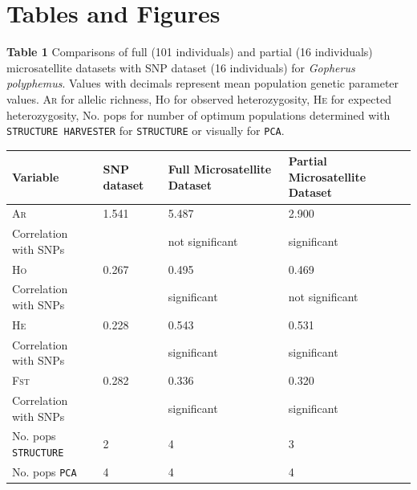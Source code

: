 \documentclass[english]{article}\usepackage[]{graphicx}\usepackage[]{color}
\begin{document}
\section*{Tables and Figures}
\noindent
\textbf{Table 1} Comparisons of full (101 individuals) and partial (16 individuals) microsatellite datasets with SNP dataset (16 individuals) for \textit{Gopherus polyphemus}. Values with decimals represent mean population genetic parameter values. \textsc{Ar} for allelic richness, \textsc{Ho} for observed heterozygosity, \textsc{He} for expected heterozygosity, No. pops for number of optimum populations determined with \texttt{STRUCTURE HARVESTER} for \texttt{STRUCTURE} or visually for \texttt{PCA}. \\
\begin{table}[ht]
\centering
\begin{tabular}{llll}
\hline
Variable & SNP dataset & Full Microsatellite Dataset & Partial Microsatellite Dataset \\ 
\hline
\textsc{Ar}           & 1.541  & 5.487           & 2.900           \\
Correlation with SNPs &        & not significant & significant     \\
\hline
\textsc{Ho}           & 0.267  & 0.495           & 0.469           \\
Correlation with SNPs &        & significant     & not significant \\
\hline
\textsc{He}           & 0.228  & 0.543    & 0.531                  \\
Correlation with SNPs &        & significant     & significant     \\
\hline
\textsc{Fst}          & 0.282  & 0.336    & 0.320                  \\
Correlation with SNPs &        & significant     & significant     \\
\hline
No. pops \texttt{STRUCTURE} & 2 & 4 & 3                            \\
\hline
No. pops \texttt{PCA} & 4 & 4 & 4                                  \\
\hline
\end{tabular}
\end{table}
\end{document}
